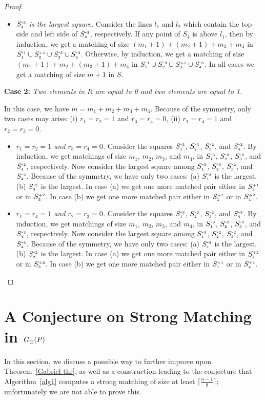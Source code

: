 \documentclass[11pt,a4paper]{article}
\newcommand{\G}[2]{G_{#1}({#2})}
\newcommand{\ddiscs}{\scriptsize \ominus}
\newcommand{\SP}[2]{S^{\text{\tiny +#1}}_\text{\tiny #2}}
\newcommand{\SM}[2]{S^{\text{-\tiny #1}}_\text{\tiny #2}}
\begin{document}
\begin{proof}
\begin{itemize}
\item {\em $\SM{3}{4}$ is the largest square.}
Consider the lines $l_1$ and $l_2$ which contain the top side and left side of $\SM{3}{4}$, respectively. If any point of $S_4$ is above $l_1$, then by induction, we get a matching of size $(m_1+1)+(m_2+1)+m_3+m_4$ in $\SM{1}{1}\cup \SP{1}{2}\cup\SM{3}{3}\cup \SM{3}{4}$. Otherwise, by induction, we get a matching of size $(m_1+1)+m_2+(m_3+1)+ m_4$ in $\SM{1}{1}\cup \SM{3}{2}\cup\SP{1}{3}\cup \SM{3}{4}$. In all cases we get a matching of size $m+1$ in $S$. 
\end{itemize}


{\bf Case 2:} {\em Two elements in $R$ are equal to 0 and two elements are equal to 1.}

In this case, we have $m = m_1 + m_2 + m_3 + m_4$. Because of the symmetry, only two cases may arise: (i) $r_1=r_2=1$ and $r_3=r_4=0$, (ii) $r_1=r_4=1$ and $r_2=r_3=0$. 
\begin{itemize}
 \item {\em $r_1=r_2=1$ and $r_3=r_4=0$.}
Consider the squares $\SM{3}{1}$, $\SM{3}{2}$, $\SM{2}{3}$, and $\SM{2}{4}$. By induction, we get matchings of size $m_1$, $m_2$, $m_3$, and $m_4$, in $\SM{3}{1}$, $\SM{3}{2}$, $\SM{2}{3}$, and $\SM{2}{4}$, respectively. Now consider the largest square among $\SM{3}{1}$, $\SM{3}{2}$, $\SM{2}{3}$, and $\SM{2}{4}$. Because of the symmetry, we have only two cases: (a) $\SM{3}{1}$ is the largest, (b) $\SM{2}{3}$ is the largest. In case (a) we get one more matched pair either in $\SP{1}{2}$ or in $\SP{2}{3}$. In case (b) we get one more matched pair either in $\SP{1}{1}$ or in $\SP{2}{4}$.

 \item {\em $r_1=r_4=1$ and $r_2=r_3=0$.}
Consider the squares $\SM{3}{1}$, $\SM{2}{2}$, $\SM{2}{3}$, and $\SM{3}{4}$. By induction, we get matchings of size $m_1$, $m_2$, $m_3$, and $m_4$, in $\SM{3}{1}$, $\SM{2}{2}$, $\SM{2}{3}$, and $\SM{3}{4}$, respectively. Now consider the largest square among $\SM{3}{1}$, $\SM{2}{2}$, $\SM{2}{3}$, and $\SM{3}{4}$. Because of the symmetry, we have only two cases: (a) $\SM{3}{1}$ is the largest, (b) $\SM{2}{2}$ is the largest. In case (a) we get one more matched pair either in $\SP{2}{2}$ or in $\SP{2}{3}$. In case (b) we get one more matched pair either in $\SP{1}{1}$ or in $\SP{1}{4}$.
\end{itemize}
\end{proof}

\section{A Conjecture on Strong Matching in $\G{\ddiscs}{P}$}
\label{conjecture-section}
In this section, we discuss a possible way to further improve upon Theorem~\ref{Gabriel-thr}, as well as
a construction leading to the conjecture that Algorithm~\ref{alg1} computes a strong matching of size at least $\lceil\frac{n-1}{8}\rceil$; unfortunately we are not able to prove this. 
\end{document}
